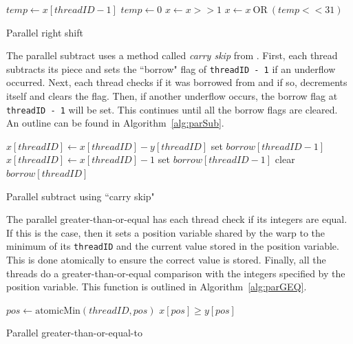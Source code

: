 \documentclass[smallextended]{svjour3}       %
\begin{document}
\begin{algorithm}
   \nl{} {
      \nl$temp\gets x[threadID - 1]$\;
   }{
      \nl$temp\gets 0$\;
   }
   \nl$x\gets x>>1$\;
   \nl$x\gets x \:\text{OR}\: (temp << 31)$\;
   \caption{Parallel right shift}
   \label{alg:parShift}
\end{algorithm}

The parallel subtract uses a method called \emph{carry skip} from 
\cite{fujimoto2009high}. First, each thread subtracts its piece and sets the 
``borrow" flag of \texttt{threadID - 1} if an underflow occurred. Next, each 
thread checks if it was borrowed from and if so, decrements itself and clears the 
flag. Then, if another underflow occurs, the borrow flag at
\texttt{threadID - 1} will be set. This continues until all the borrow flags
are cleared. An outline can be found in Algorithm~\ref{alg:parSub}.

\begin{algorithm}
   \nl$x[threadID]\gets x[threadID]-y[threadID]$\;
   \nl{} {
      \nl set $borrow[threadID - 1]$\;
   }
   \nl{} {
   \nl{} {
      \nl$x[threadID]\gets x[threadID] - 1$\;
         \nl{} {
            \nl set $borrow[threadID - 1]$\;
         }
         \nl clear $borrow[threadID]$\;
      }
   }
   \caption{Parallel subtract using ``carry skip"}
   \label{alg:parSub}
\end{algorithm}

The parallel greater-than-or-equal has each thread check if its integers are 
equal. If this is the case, then it sets a position variable shared by the warp 
to the minimum of its \texttt{threadID} and the current value stored in the position variable.
This is done atomically to ensure the correct value is stored. Finally, all 
the threads do a greater-than-or-equal comparison with the integers specified
by the position variable. This function is outlined in Algorithm~\ref{alg:parGEQ}.
\begin{algorithm}
   \nl{} {
      \nl$pos\gets \text{atomicMin}(threadID, pos)$\;
   }
   \nl\Return $x[pos] \geq y[pos]$
   \caption{Parallel greater-than-or-equal-to}
   \label{alg:parGEQ}
\end{algorithm}
\end{document}

